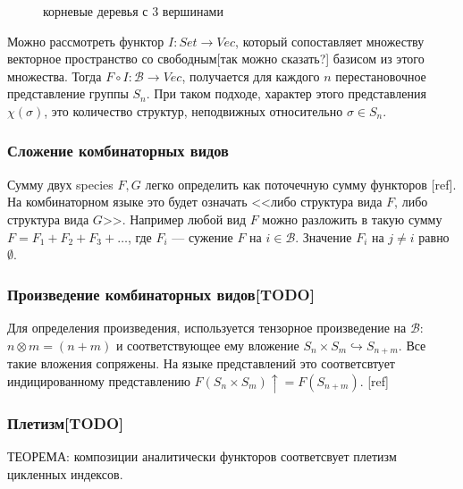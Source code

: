 \begin{figure}
\begin{center}
\end{center}
\caption{корневые деревья с 3 вершинами}
\label{pic:3-rooted-trees}
\end{figure}

Можно рассмотреть функтор $I:Set \rightarrow Vec$, который сопоставляет множеству
векторное пространство со свободным[так можно сказать?] базисом из этого
множества.
Тогда $F \circ I: \mathcal B \rightarrow Vec$, получается для каждого $n$
перестановочное представление группы $S_n$. При таком подходе, характер этого
представления $\chi(\sigma)$, это количество структур, неподвижных относительно $\sigma \in S_n$.

\subsubsection{Сложение комбинаторных видов}
Сумму двух species $F, G$ легко определить как поточечную сумму функторов [ref].
На комбинаторном языке это будет означать <<либо структура вида $F$, либо
структура вида $G$>>. Например любой вид $F$ можно разложить в такую сумму $F =
F_{1} + F_{2} + F_{3} + \dots$, где $F_{i}$ --- сужение $F$ на $i \in \mathcal
B$. Значение $F_{i}$ на $j \neq i$ равно $\emptyset$.

\subsubsection{Произведение комбинаторных видов[TODO]}
Для определения произведения, используется тензорное произведение на $\mathcal
B$: $n \otimes m = (n + m)$ и соответствующее ему вложение $S_n \times S_m
\hookrightarrow S_{n+m}$. Все такие вложения сопряжены. На языке представлений
это соответсвтует индицированному представлению $F(S_n \times S_m)\uparrow =
F(S_{n+m})$. [ref]

\subsubsection{Плетизм[TODO]}
ТЕОРЕМА: композиции аналитически функторов соответсвует плетизм цикленных
индексов.

